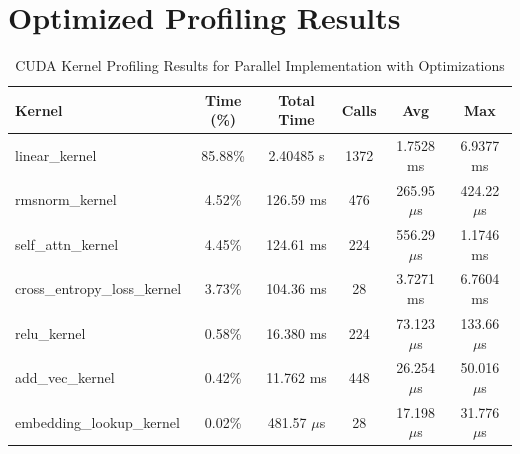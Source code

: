 \section{Optimized Profiling Results}
\label{appendix:profile}
\begin{table}[H]
\centering
\small
\renewcommand{\arraystretch}{1.2}
\setlength{\tabcolsep}{6pt}
\begin{tabular}{lccccc}
\hline
\textbf{Kernel} & \textbf{Time (\%)} & \textbf{Total Time} & \textbf{Calls} & \textbf{Avg} & \textbf{Max} \\
\hline
linear\_kernel & 85.88\% & 2.40485 s & 1372 & 1.7528 ms & 6.9377 ms \\
rmsnorm\_kernel & 4.52\% & 126.59 ms & 476 & 265.95 $\mu$s & 424.22 $\mu$s \\
self\_attn\_kernel & 4.45\% & 124.61 ms & 224 & 556.29 $\mu$s & 1.1746 ms \\
cross\_entropy\_loss\_kernel & 3.73\% & 104.36 ms & 28 & 3.7271 ms & 6.7604 ms \\
relu\_kernel & 0.58\% & 16.380 ms & 224 & 73.123 $\mu$s & 133.66 $\mu$s \\
add\_vec\_kernel & 0.42\% & 11.762 ms & 448 & 26.254 $\mu$s & 50.016 $\mu$s \\
embedding\_lookup\_kernel & 0.02\% & 481.57 $\mu$s & 28 & 17.198 $\mu$s & 31.776 $\mu$s \\
\hline
\end{tabular}
\label{tab:profile_optimization}
\caption{CUDA Kernel Profiling Results for Parallel Implementation with Optimizations}
\end{table}